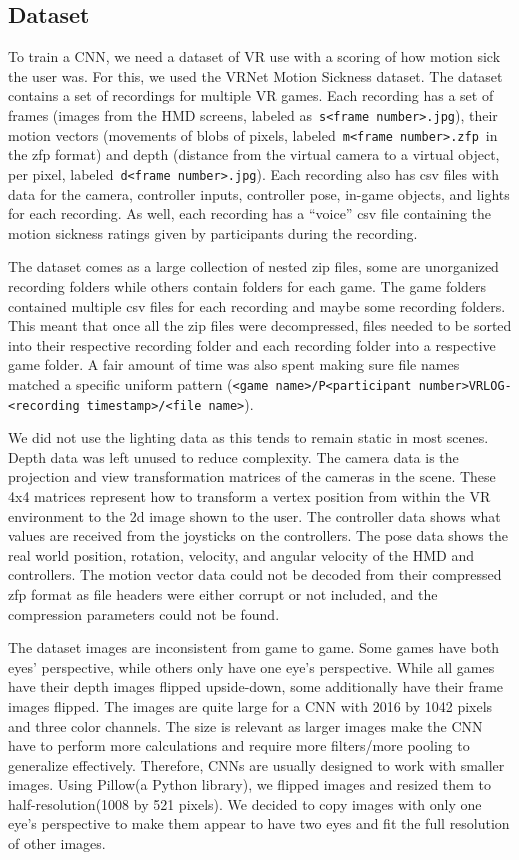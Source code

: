 \subsection{Dataset}
\label{subsec:dataset}

To train a CNN, we need a dataset of VR use with a scoring of how motion sick the user was.
For this, we used the VRNet Motion Sickness dataset\cite{wen2023vr}.
The dataset contains a set of recordings for multiple VR games.
Each recording has a set of frames (images from the HMD screens, labeled as~\verb+s<frame number>.jpg+), their motion vectors (movements of blobs of pixels, labeled~\verb+m<frame number>.zfp+~in the zfp format) and depth (distance from the virtual camera to a virtual object, per pixel, labeled~\verb+d<frame number>.jpg+).
Each recording also has csv files with data for the camera, controller inputs, controller pose, in-game objects, and lights for each recording.
As well, each recording has a ``voice'' csv file containing the motion sickness ratings given by participants during the recording.

The dataset comes as a large collection of nested zip files, some are unorganized recording folders while others contain folders for each game.
The game folders contained multiple csv files for each recording and maybe some recording folders.
This meant that once all the zip files were decompressed, files needed to be sorted into their respective recording folder and each recording folder into a respective game folder.
A fair amount of time was also spent making sure file names matched a specific uniform pattern (\verb+<game name>/P<participant number>VRLOG-<recording timestamp>/<file name>+).

We did not use the lighting data as this tends to remain static in most scenes.
Depth data was left unused to reduce complexity.
The camera data is the projection and view transformation matrices of the cameras in the scene.
These 4x4 matrices represent how to transform a vertex position from within the VR environment to the 2d image shown to the user.
The controller data shows what values are received from the joysticks on the controllers.
The pose data shows the real world position, rotation, velocity, and angular velocity of the HMD and controllers.
The motion vector data could not be decoded from their compressed zfp format as file headers were either corrupt or not included, and the compression parameters could not be found.

The dataset images are inconsistent from game to game.
Some games have both eyes' perspective, while others only have one eye's perspective.
While all games have their depth images flipped upside-down, some additionally have their frame images flipped.
The images are quite large for a CNN with 2016 by 1042 pixels and three color channels.
The size is relevant as larger images make the CNN have to perform more calculations and require more filters/more pooling to generalize effectively.
Therefore, CNNs are usually designed to work with smaller images.
Using Pillow(a Python library), we flipped images and resized them to half-resolution(1008 by 521 pixels).
We decided to copy images with only one eye's perspective to make them appear to have two eyes and fit the full resolution of other images.

